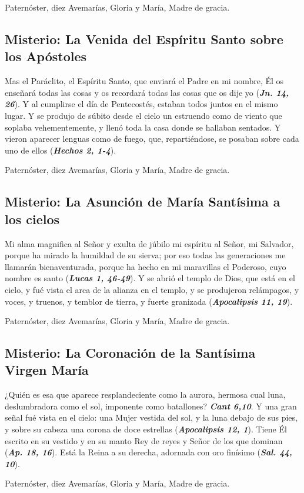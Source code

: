 \documentclass[./main.tex]{subfiles}
\newcounter{glorious-counter}
\begin{document}
\begin{center}
      Paternóster, diez Avemarías, Gloria y María, Madre de gracia.
\end{center}

\subsection*{ Misterio: La Venida del Espíritu Santo sobre los Apóstoles}
Mas el Paráclito, el Espíritu Santo, que enviará el Padre en mi nombre, Él os enseñará todas las cosas y os recordará todas las cosas que os dije yo (\textbf{\emph{Jn. 14, 26}}). 
Y al cumplirse el día de Pentecostés, estaban todos juntos en el mismo lugar. Y se produjo de súbito desde el cielo un estruendo como de viento que soplaba vehementemente, 
y llenó toda la casa donde se hallaban sentados. Y vieron aparecer lenguas como de fuego, que, repartiéndose, se posaban sobre cada uno de ellos (\textbf{\emph{Hechos 2, 1-4}}).

\begin{center}
      Paternóster, diez Avemarías, Gloria y María, Madre de gracia.
\end{center}

\subsection*{ Misterio: La Asunción de María Santísima a los cielos}
Mi alma magnifica al Señor y exulta de júbilo mi espíritu al Señor, mi Salvador, porque ha mirado la humildad de su sierva; por eso todas las generaciones
me llamarán bienaventurada, porque ha hecho en mi maravillas el Poderoso, cuyo nombre es santo (\textbf{\emph{Lucas 1, 46-49}}). Y se abrió el templo de Dios, que está en el cielo, y 
fué vista el arca de la alianza en el templo, y se produjeron relámpagos, y voces, y truenos, y temblor de tierra, y fuerte granizada (\textbf{\emph{Apocalipsis 11, 19}}).

\begin{center}
      Paternóster, diez Avemarías, Gloria y María, Madre de gracia.
\end{center}

\subsection*{ Misterio: La Coronación de la Santísima Virgen María}
¿Quién es esa que aparece resplandeciente como la aurora, hermosa cual luna, deslumbradora como el sol, imponente como batallones? \textbf{\emph{Cant 6,10}}. Y una gran señal 
fué vista en el cielo: una Mujer vestida del sol, y la luna debajo de sus  pies, y sobre su cabeza una corona de doce estrellas (\textbf{\emph{Apocalipsis 12, 1}}). 
Tiene Él escrito en su vestido y en su manto Rey de reyes y Señor de los que dominan (\textbf{\emph{Ap. 18, 16}}). 
Está la Reina a su derecha, adornada con oro finísimo (\textbf{\emph{Sal. 44, 10}}).

\begin{center}
      Paternóster, diez Avemarías, Gloria y María, Madre de gracia.
\end{center}
\end{document}
